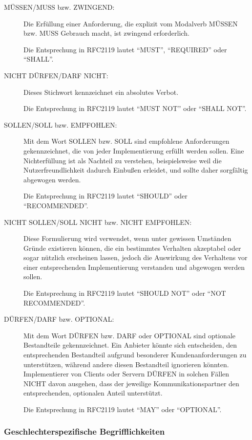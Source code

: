 \documentclass[,a4paper]{article}
\begin{document}
\begin{description}
\item[MÜSSEN/MUSS bzw. ZWINGEND:]
Die Erfüllung einer Anforderung, die explizit vom Modalverb MÜSSEN bzw.
MUSS Gebrauch macht, ist zwingend erforderlich.

Die Entsprechung in RFC2119 lautet ``MUST'', ``REQUIRED'' oder
``SHALL''.
\item[NICHT DÜRFEN/DARF NICHT:]
Dieses Stichwort kennzeichnet ein absolutes Verbot.

Die Entsprechung in RFC2119 lautet ``MUST NOT'' oder ``SHALL NOT''.
\item[SOLLEN/SOLL bzw. EMPFOHLEN:]
Mit dem Wort SOLLEN bzw. SOLL sind empfohlene Anforderungen
gekennzeichnet, die von jeder Implementierung erfüllt werden sollen.
Eine Nichterfüllung ist als Nachteil zu verstehen, beispielsweise weil
die Nutzerfreundlichkeit dadurch Einbußen erleidet, und sollte daher
sorgfältig abgewogen werden.

Die Entsprechung in RFC2119 lautet ``SHOULD'' oder ``RECOMMENDED''.
\item[NICHT SOLLEN/SOLL NICHT bzw. NICHT EMPFOHLEN:]
Diese Formulierung wird verwendet, wenn unter gewissen Umständen Gründe
existieren können, die ein bestimmtes Verhalten akzeptabel oder sogar
nützlich erscheinen lassen, jedoch die Auswirkung des Verhaltens vor
einer entsprechenden Implementierung verstanden und abgewogen werden
sollen.

Die Entsprechung in RFC2119 lautet ``SHOULD NOT'' oder ``NOT
RECOMMENDED''.
\item[DÜRFEN/DARF bzw. OPTIONAL:]
Mit dem Wort DÜRFEN bzw. DARF oder OPTIONAL sind optionale Bestandteile
gekennzeichnet. Ein Anbieter könnte sich entscheiden, den entsprechenden
Bestandteil aufgrund besonderer Kundenanforderungen zu unterstützen,
während andere diesen Bestandteil ignorieren könnten. Implementierer von
Clients oder Servern DÜRFEN in solchen Fällen NICHT davon ausgehen, dass
der jeweilige Kommunikationspartner den entsprechenden, optionalen
Anteil unterstützt.

Die Entsprechung in RFC2119 lautet ``MAY'' oder ``OPTIONAL''.
\end{description}

\subsubsection{Geschlechterspezifische
Begrifflichkeiten}\label{geschlechterspezifische-begrifflichkeiten}
\end{document}
